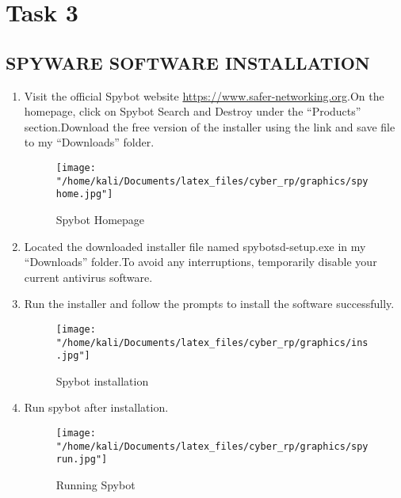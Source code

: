 \chapter*{\centering Task 3}

\section*{SPYWARE SOFTWARE INSTALLATION}

\begin{enumerate}
	\item
Visit the official Spybot website \url{https://www.safer-networking.org}.On the homepage, click on Spybot Search and Destroy under the “Products” section.Download the free version of the installer using the link and save file to my “Downloads” folder.
	\begin{figure}[H]
		\centering
		\texttt{[image: "/home/kali/Documents/latex\_files/cyber\_rp/graphics/spyhome.jpg"]} \\
		\caption{Spybot Homepage}
	\end{figure}
	\item
	Located the downloaded installer file named spybotsd-setup.exe in my “Downloads” folder.To avoid any interruptions, temporarily disable your current antivirus software.
	\item
	Run the installer and follow the prompts to install the software successfully.
		\begin{figure}[H]
		\centering
		\texttt{[image: "/home/kali/Documents/latex\_files/cyber\_rp/graphics/ins.jpg"]} \\
		\caption{Spybot installation}
	\end{figure}
	\item
	Run spybot after installation.
		\begin{figure}[H]
		\centering
		\texttt{[image: "/home/kali/Documents/latex\_files/cyber\_rp/graphics/spyrun.jpg"]} \\
		\caption{Running Spybot}
	\end{figure}

\end{enumerate}